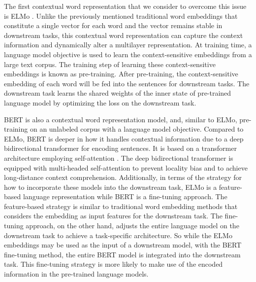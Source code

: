 \documentclass[11pt,a4paper]{article}
\begin{document}
The first contextual word representation that we consider to overcome this issue is ELMo \cite{peters2018deep}. Unlike the previously mentioned traditional word embeddings that constitute a single vector for each word and the vector remains stable in downstream tasks, this contextual word representation can capture the context information and dynamically alter a multilayer representation. At training time, a language model objective is used to learn the context-sensitive embeddings from a large text corpus. The training step of learning these context-sensitive embeddings is known as pre-training. After pre-training, the context-sensitive embedding of each word will be fed into the sentences for downstream tasks. The downstream task learns the shared weights of the inner state of pre-trained language model by optimizing the loss on the downstream task.

BERT \cite{devlin2018bert} is also a contextual word representation model, and, similar to ELMo, pre-training on an 
unlabeled corpus with a language model objective. Compared to ELMo, BERT is deeper in how it handles contextual information due to a deep bidirectional transformer for encoding sentences. It is based on a transformer architecture employing self-attention \cite{vaswani2017attention}. The deep bidirectional transformer is equipped with multi-headed self-attention to prevent locality bias and to achieve long-distance context comprehension. Additionally, in terms of the strategy for how to incorporate these models into the downstream task, ELMo is a feature-based language representation while BERT is a fine-tuning approach. The feature-based strategy is similar to traditional word embedding methods that considers the embedding as input features for the downstream task. The fine-tuning approach, on the other hand, adjusts the entire language model on the downstream task to achieve a task-specific architecture. So while the ELMo embeddings may be used as the input of a downstream model, with the BERT fine-tuning method, the entire BERT model is integrated into the downstream task. This fine-tuning strategy is more likely to make use of the encoded information in the pre-trained language models.
\end{document}
